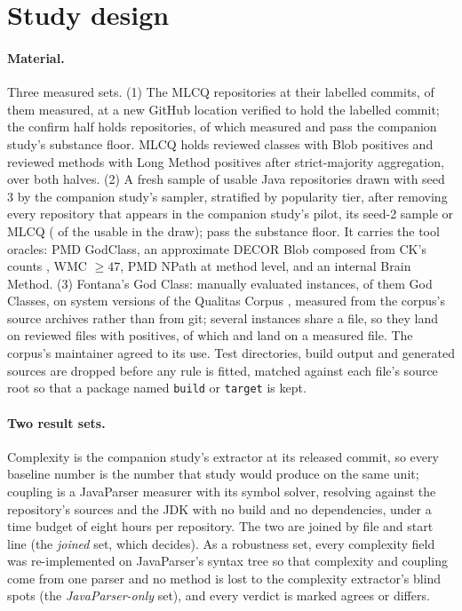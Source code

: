 \documentclass[11pt,a4paper]{article}
\begin{document}
\section{Study design}
\label{sec:design}

\paragraph{Material.} Three measured sets. (1) The \mlcqRepos{} MLCQ
repositories at their labelled commits, \mlcqMeasured{} of them measured,
\mlcqMovedMeasured{} at a new GitHub location verified to hold the labelled
commit; the confirm half holds \mlcqConfirmMeasured{} repositories, of
which \mlcqConfirmUsable{} measured and pass the companion study's
substance floor. MLCQ holds \mlcqBlobReviewed{} reviewed classes with
\mlcqBlob{} Blob positives and \mlcqLongReviewed{} reviewed methods with
\mlcqLong{} Long Method positives after strict-majority aggregation, over
both halves. (2) A fresh sample of \seedThreeMeasured{} usable Java
repositories drawn with seed 3 by the companion study's sampler, stratified
by popularity tier, after removing every repository that appears in the
companion study's pilot, its seed-2 sample or MLCQ (\seedThreeExcluded{}
of the \seedThreeDrawUsable{} usable in the draw); \seedThreeUsable{} pass
the substance floor. It carries the tool oracles: PMD GodClass, an
approximate DECOR Blob composed from CK's counts \cite{moha2010, cktool},
WMC $\geq 47$, PMD NPath at method level, and an internal Brain Method.
(3) Fontana's God Class: \fontanaInstances{} manually evaluated instances,
\fontanaGodInstances{} of them God Classes, on \fontanaSystems{} system
versions of the Qualitas Corpus \cite{tempero2010}, measured from the
corpus's source archives rather than from git; several instances share a
file, so they land on \fontanaFilesReviewed{} reviewed files with
\fontanaFilesGod{} positives, of which \fontanaFilesReviewedMeasured{} and
\fontanaFilesGodMeasured{} land on a measured file. The corpus's maintainer
agreed to its use. Test directories, build output and generated sources
are dropped before any rule is fitted, matched against each file's source
root so that a package named \texttt{build} or \texttt{target} is kept.

\paragraph{Two result sets.} Complexity is the companion study's extractor
at its released commit, so every baseline number is the number that study
would produce on the same unit; coupling is a JavaParser measurer with its
symbol solver, resolving against the repository's sources and the JDK with
no build and no dependencies, under a time budget of eight hours per
repository. The two are joined by file and start line (the \emph{joined}
set, which decides). As a robustness set, every complexity field was
re-implemented on JavaParser's syntax tree so that complexity and coupling
come from one parser and no method is lost to the complexity extractor's
blind spots (the \emph{JavaParser-only} set), and every verdict is marked
agrees or differs.
\end{document}
